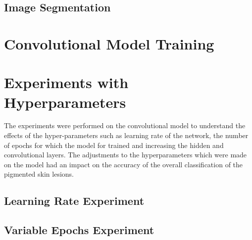 \subsection{ Image Segmentation }

\pagebreak
\section{Convolutional Model Training}


\pagebreak
\section{Experiments with Hyperparameters}
The experiments were performed on the convolutional model to understand the effects of the hyper-parameters 
such as learning rate of the network, the number of epochs for which the model for trained and increasing the hidden  
and convolutional layers. The adjustments to the hyperparameters which were made on the model had an impact on the accuracy of the overall classification of the pigmented skin lesions.
\subsection{Learning Rate Experiment}


\subsection{Variable Epochs Experiment}

